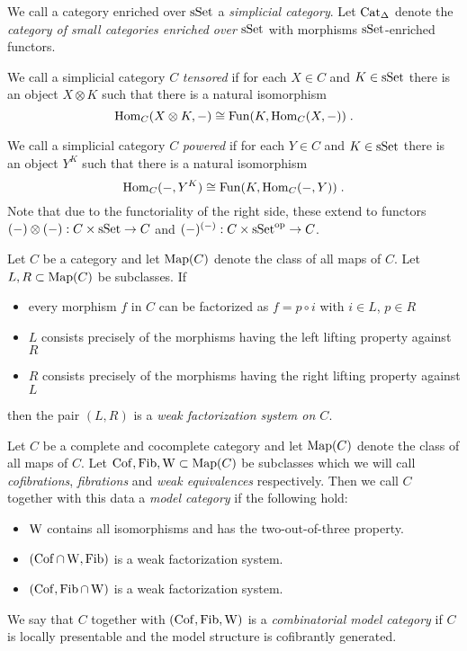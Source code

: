 \begin{definition}
    We call a category enriched over $\operatorname{sSet}$ a \emph{simplicial category}.
    Let $\operatorname{Cat}_{\Delta}$ denote the \emph{category of small categories enriched over $\operatorname{sSet}$} with morphisms $\operatorname{sSet}$-enriched functors.
    
    We call a simplicial category $C$ \emph{tensored} if for each $X\in C$ and $K\in\operatorname{sSet}$ there is an object $X\otimes K$ such that there is a natural isomorphism
    \begin{equation*}
        \operatorname{Hom}_C(X\otimes K,-)\cong\operatorname{Fun}(K,\operatorname{Hom}_C(X,-))\;.
    \end{equation*}

    We call a simplicial category $C$ \emph{powered} if for each $Y\in C$ and $K\in\operatorname{sSet}$ there is an object $Y^K$ such that there is a natural isomorphism
    \begin{equation*}
        \operatorname{Hom}_C(-,Y^K)\cong\operatorname{Fun}(K,\operatorname{Hom}_C(-,Y))\;.
    \end{equation*}
    Note that due to the functoriality of the right side, these extend to functors $(-)\otimes(-):C\times\operatorname{sSet}\to C$ and $(-)^{(-)}:C\times\operatorname{sSet}^{\operatorname{op}}\to C$.
\end{definition}
\begin{definition}
    Let $C$ be a category and let $\operatorname{Map}(C)$ denote the class of all maps of $C$.
    Let $L,R\subset\operatorname{Map}(C)$ be subclasses.
    If 
    \begin{itemize}
        \item every morphism $f$ in $C$ can be factorized as $f=p\circ i$ with $i\in L$, $p\in R$
        \item $L$ consists precisely of the morphisms having the left lifting property against $R$
        \item $R$ consists precisely of the morphisms having the right lifting property against $L$
    \end{itemize}
    then the pair $(L,R)$ is a \emph{weak factorization system on $C$}.
\end{definition}
\begin{definition}
    Let $C$ be a complete and cocomplete category and let $\operatorname{Map}(C)$ denote the class of all maps of $C$.
    Let $\operatorname{Cof},\operatorname{Fib},\operatorname{W}\subset\operatorname{Map}(C)$ be subclasses which we will call \emph{cofibrations}, \emph{fibrations} and \emph{weak equivalences} respectively.
    Then we call $C$ together with this data a \emph{model category} if the following hold:
    \begin{itemize}
        \item $\operatorname{W}$ contains all isomorphisms and has the two-out-of-three property.
        \item $(\operatorname{Cof}\cap\operatorname{W},\operatorname{Fib})$ is a weak factorization system.
        \item $(\operatorname{Cof},\operatorname{Fib}\cap\operatorname{W})$ is a weak factorization system.
    \end{itemize}
    We say that $C$ together with $(\operatorname{Cof},\operatorname{Fib},\operatorname{W})$ is a \emph{combinatorial model category} if $C$ is locally presentable and the model structure is cofibrantly generated.
\end{definition}
